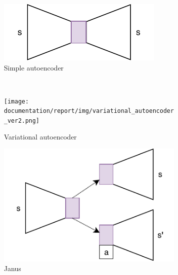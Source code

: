 \begin{figure}[ht!]
	\centering
	\begin{subfigure}{0.45\columnwidth}
		\centering
		\includegraphics[width=\linewidth]{img/very_simple_autoencoder.pdf}
		\caption{Simple autoencoder}
		\label{subfig:repr_learner_simple_autoencoder}
	\end{subfigure}%
	~ 
	\begin{subfigure}{0.45\columnwidth}
		\centering
		\texttt{[image: documentation/report/img/variational\_autoencoder\_ver2.png]}
		\caption{Variational autoencoder}
		\label{subfig:repr_learner_vae}
	\end{subfigure}
	\begin{subfigure}{0.5\columnwidth}
		\centering
		\includegraphics[width=\linewidth]{img/janus.pdf}
		\caption{Janus}
		\label{subfig:repr_learner_janus}
	\end{subfigure}%
	~ 
	\begin{subfigure}{0.5\columnwidth}
		\centering

\end{subfigure}
\end{figure}
